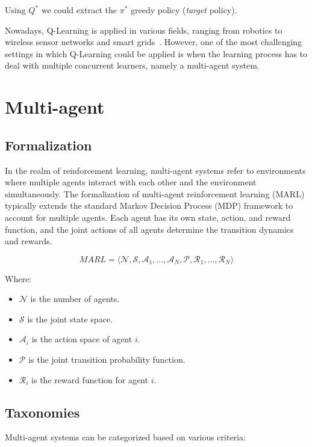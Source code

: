 %
Using $Q^*$ we could extract the $\pi^*$ greedy policy (\emph{target} policy).

Nowadays, Q-Learning is applied in various fields, ranging from robotics to wireless sensor networks and smart grids~\cite{DBLP:journals/access/JangKHK19}.
%
However, one of the most challenging settings in which Q-Learning could be applied is when the learning process has to deal with multiple concurrent learners, namely a multi-agent system.
\section{Multi-agent}
\subsection{Formalization}
In the realm of reinforcement learning, multi-agent systems refer to environments where multiple agents interact with each other and the environment simultaneously. The formalization of multi-agent reinforcement learning (MARL) typically extends the standard Markov Decision Process (MDP) framework to account for multiple agents. Each agent has its own state, action, and reward function, and the joint actions of all agents determine the transition dynamics and rewards.

\begin{equation}
MARL = \langle \mathcal{N}, \mathcal{S}, \mathcal{A}_1, \ldots, \mathcal{A}_N, \mathcal{P}, \mathcal{R}_1, \ldots, \mathcal{R}_N \rangle
\end{equation}

Where:
\begin{itemize}
    \item $\mathcal{N}$ is the number of agents.
    \item $\mathcal{S}$ is the joint state space.
    \item $\mathcal{A}_i$ is the action space of agent $i$.
    \item $\mathcal{P}$ is the joint transition probability function.
    \item $\mathcal{R}_i$ is the reward function for agent $i$.
\end{itemize}

\subsection{Taxonomies}
Multi-agent systems can be categorized based on various criteria:

